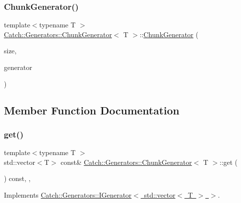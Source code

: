 \subsubsection{\texorpdfstring{Chunk\+Generator()}{ChunkGenerator()}}
{\footnotesize\ttfamily template$<$typename T $>$ \\
\mbox{\hyperlink{class_catch_1_1_generators_1_1_chunk_generator}{Catch\+::\+Generators\+::\+Chunk\+Generator}}$<$ T $>$\+::\mbox{\hyperlink{class_catch_1_1_generators_1_1_chunk_generator}{Chunk\+Generator}} (\begin{DoxyParamCaption}\item[{size\+\_\+t}]{size,  }\item[{\mbox{\hyperlink{class_catch_1_1_generators_1_1_generator_wrapper}{Generator\+Wrapper}}$<$ T $>$}]{generator }\end{DoxyParamCaption})\hspace{0.3cm}{\ttfamily [inline]}}



\subsection{Member Function Documentation}
\mbox{\label{class_catch_1_1_generators_1_1_chunk_generator_aa41c7d08a165b6a18560f2ab9e977f0b}} 
\subsubsection{\texorpdfstring{get()}{get()}}
{\footnotesize\ttfamily template$<$typename T $>$ \\
std\+::vector$<$T$>$ const\& \mbox{\hyperlink{class_catch_1_1_generators_1_1_chunk_generator}{Catch\+::\+Generators\+::\+Chunk\+Generator}}$<$ T $>$\+::get (\begin{DoxyParamCaption}{ }\end{DoxyParamCaption}) const\hspace{0.3cm}{\ttfamily [inline]}, {\ttfamily [override]}, {\ttfamily [virtual]}}



Implements \mbox{\hyperlink{struct_catch_1_1_generators_1_1_i_generator_a525d381fc9249a885b075a0632a8579a}{Catch\+::\+Generators\+::\+I\+Generator$<$ std\+::vector$<$ T $>$ $>$}}.


